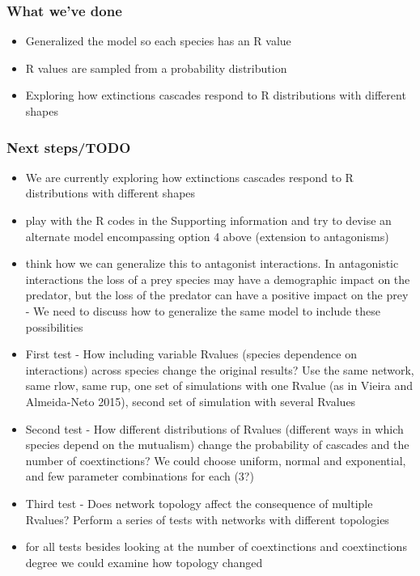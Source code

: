 \documentclass[12pt]{article}
\begin{document}
\subsubsection*{What we've done}

\begin{itemize}

	\item Generalized the model so each species has an R value 

	\item R values are sampled from a probability distribution

	\item Exploring how extinctions cascades respond to R distributions with different shapes	
\end{itemize}

\subsubsection*{Next steps/TODO}

\begin{itemize}
	
	\item We are currently exploring how extinctions cascades respond to R distributions with different shapes
	
	\item play with the R codes in the Supporting information and try to devise an alternate model encompassing option 4 above (extension to antagonisms)
	
	\item think how we can generalize this to antagonist interactions. In antagonistic interactions the loss of a prey species may have a demographic impact on the predator, but the loss of the predator can have a positive impact on the prey - We need to discuss how to generalize the same model to include these possibilities


	\item First test - How including variable Rvalues (species dependence on interactions) across species change the original results? Use the same network, same rlow, same rup, one set of simulations with one Rvalue (as in Vieira and Almeida-Neto 2015), second set of simulation with several Rvalues

	\item Second test - How different distributions of Rvalues (different ways in which species depend on the mutualism) change the probability of cascades and the number of coextinctions? We could choose uniform, normal and exponential, and few parameter combinations for each (3?)

	\item Third test - Does network topology affect the consequence of multiple Rvalues? Perform a series of tests with networks with different topologies

	\item for all tests besides looking at the number of coextinctions and coextinctions degree we could examine how topology changed

\end{itemize}
\end{document}
